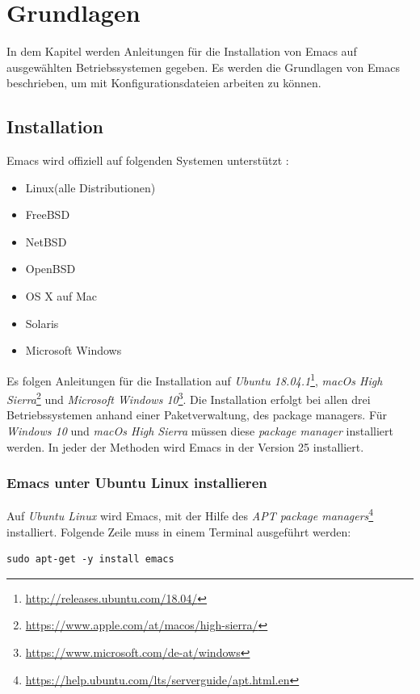 \chapter{Grundlagen}
\label{cha:grundlagen}
In dem Kapitel werden Anleitungen für die Installation von Emacs auf
ausgewählten Betriebssystemen gegeben. Es werden die Grundlagen von
Emacs beschrieben, um mit Konfigurationsdateien arbeiten zu können.\\

\section{Installation}
Emacs wird offiziell auf folgenden Systemen unterstützt \cite{Hahn2016}:
\begin{itemize}
\item Linux(alle Distributionen)
\item FreeBSD
\item NetBSD
\item OpenBSD
\item OS X auf Mac
\item Solaris
\item Microsoft Windows\\
\end{itemize}
Es folgen Anleitungen für die Installation auf \textit{Ubuntu
  18.04.1}\footnote{\url{http://releases.ubuntu.com/18.04/}},
\textit{macOs High
  Sierra}\footnote{\url{https://www.apple.com/at/macos/high-sierra/}}
und \textit{Microsoft Windows
  10}\footnote{\url{https://www.microsoft.com/de-at/windows}}. Die
Installation erfolgt bei allen drei Betriebssystemen anhand einer
Paketverwaltung, des {\glqq}package managers{\grqq}. Für
\textit{Windows 10} und \textit{macOs High Sierra} müssen diese
\textit{package manager} installiert werden. In jeder der Methoden
wird Emacs in der Version 25 installiert.\\

\subsection{Emacs unter Ubuntu Linux installieren}
Auf \textit{Ubuntu Linux} wird Emacs, mit der Hilfe des \textit{APT
  package
  managers}\footnote{\url{https://help.ubuntu.com/lts/serverguide/apt.html.en}}
installiert. Folgende Zeile muss in einem Terminal ausgeführt werden:
\begin{lstlisting}
sudo apt-get -y install emacs
\end{lstlisting}


